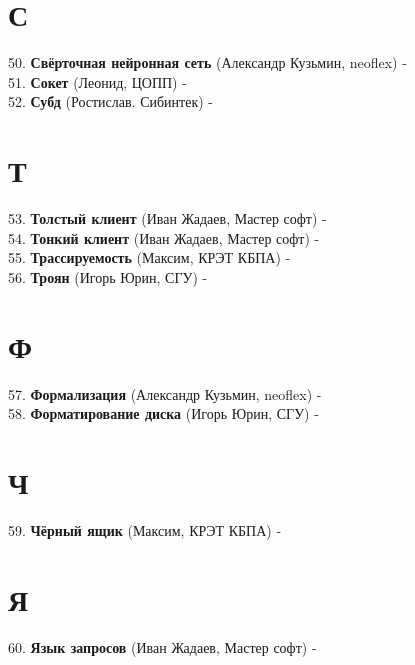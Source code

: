 \documentclass[14 pt]{extarticle}
\begin{document}
\section*{С}
    50. \textbf{Свёрточная нейронная сеть} (Александр Кузьмин, neoflex) - \\
    
    51. \textbf{Сокет} (Леонид, ЦОПП) -  \\
    
    52. \textbf{Субд} (Ростислав. Сибинтек) - \\
    
\section*{Т}
    53. \textbf{Толстый клиент} (Иван Жадаев, Мастер софт) -  \\
    
    54. \textbf{Тонкий клиент} (Иван Жадаев, Мастер софт) -  \\
    
    55. \textbf{Трассируемость} (Максим, КРЭТ КБПА) - \\
    
    56. \textbf{Троян} (Игорь Юрин, СГУ) - \\
    
\section*{Ф}
    57. \textbf{Формализация} (Александр Кузьмин, neoflex) - \\
    
    58. \textbf{Форматирование диска} (Игорь Юрин, СГУ) - \\
    
\section*{Ч}
    59. \textbf{Чёрный ящик} (Максим, КРЭТ КБПА) - \\
    
\section*{Я}
    60. \textbf{Язык запросов} (Иван Жадаев, Мастер софт) -  \\
    
\end{document}
